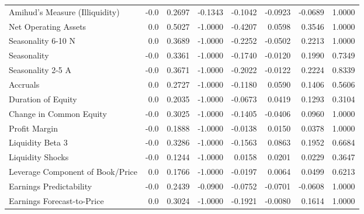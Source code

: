 \begin{tabular}{lrrrrrrr}
Amihud's Measure (Illiquidity)             &  -0.0 &  0.2697 & -0.1343 & -0.1042 & -0.0923 & -0.0689 &  1.0000 \\
Net Operating Assets                       &   0.0 &  0.5027 & -1.0000 & -0.4207 &  0.0598 &  0.3546 &  1.0000 \\
Seasonality 6-10 N                         &   0.0 &  0.3689 & -1.0000 & -0.2252 & -0.0502 &  0.2213 &  1.0000 \\
Seasonality                                &  -0.0 &  0.3361 & -1.0000 & -0.1740 & -0.0120 &  0.1990 &  0.7349 \\
Seasonality 2-5 A                          &  -0.0 &  0.3671 & -1.0000 & -0.2022 & -0.0122 &  0.2224 &  0.8339 \\
Accruals                                   &   0.0 &  0.2727 & -1.0000 & -0.1180 &  0.0590 &  0.1406 &  0.5606 \\
Duration of Equity                         &   0.0 &  0.2035 & -1.0000 & -0.0673 &  0.0419 &  0.1293 &  0.3104 \\
Change in Common Equity                    &  -0.0 &  0.3025 & -1.0000 & -0.1405 & -0.0406 &  0.0960 &  1.0000 \\
Profit Margin                              &  -0.0 &  0.1888 & -1.0000 & -0.0138 &  0.0150 &  0.0378 &  1.0000 \\
Liquidity Beta 3                           &  -0.0 &  0.3286 & -1.0000 & -0.1563 &  0.0863 &  0.1952 &  0.6684 \\
Liquidity Shocks                           &  -0.0 &  0.1244 & -1.0000 &  0.0158 &  0.0201 &  0.0229 &  0.3647 \\
Leverage Component of Book/Price           &   0.0 &  0.1766 & -1.0000 & -0.0197 &  0.0064 &  0.0499 &  0.6213 \\
Earnings Predictability                    &  -0.0 &  0.2439 & -0.0900 & -0.0752 & -0.0701 & -0.0608 &  1.0000 \\
Earnings Forecast-to-Price                 &   0.0 &  0.3024 & -1.0000 & -0.1921 & -0.0080 &  0.1614 &  1.0000 \\
\bottomrule
\end{tabular}
